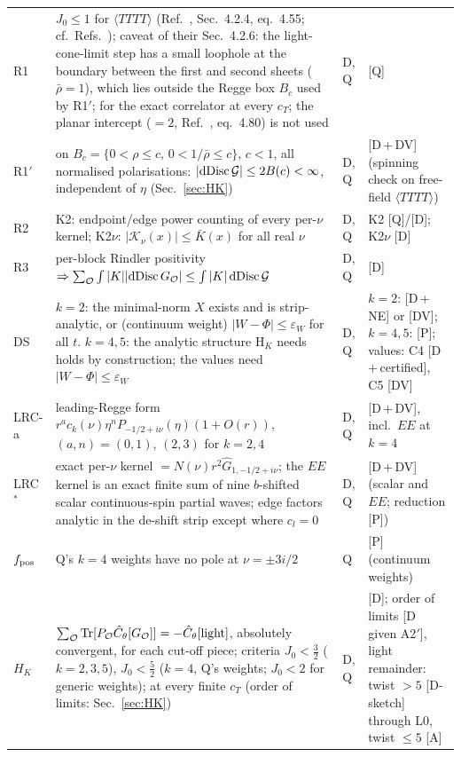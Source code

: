 \documentclass[aps,prl,onecolumn,superscriptaddress,nofootinbib]{revtex4-2}
\begin{document}
\begin{table}[!htbp]
\begin{ruledtabular}
\begin{tabular}{L{1.5cm}L{9.6cm}L{0.8cm}L{4.3cm}}
R1 & $J_0\le1$ for $\langle TTTT\rangle$ (Ref.~\cite{KKSDZ}, Sec.~4.2.4, eq.\ 4.55; cf.\ Refs.~\cite{CaronHuotInversion,HaringZhiboedov}); caveat of their Sec.~4.2.6: the light-cone-limit step has a small loophole at the boundary between the first and second sheets ($\bar\rho=1$), which lies outside the Regge box $B_c$ used by R1$'$; for the exact correlator at every $c_T$; the planar intercept ($=2$, Ref.~\cite{KKSDZ}, eq.~4.80) is not used & D, Q & [Q]\\
R1$'$ & on $B_c=\{0<\rho\le c,\,0<1/\bar\rho\le c\}$, $c<1$, all normalised polarisations: $|{\rm dDisc}\,\mathcal G|\le2B(c)<\infty$, independent of $\eta$ (Sec.~\ref{sec:HK}) & D, Q & [D\,+\,DV] (spinning check on free-field $\langle TTTT\rangle$)\\
R2 & K2: endpoint/edge power counting of every per-$\nu$ kernel; K2$\nu$: $|\mathcal K_\nu(x)|\le\bar K(x)$ for all real $\nu$ & D, Q & K2 [Q]/[D]; K2$\nu$ [D]\\
R3 & per-block Rindler positivity $\Rightarrow\sum_{\mathcal O}\int|K||{\rm dDisc}\,G_{\mathcal O}|\le\int|K|\,{\rm dDisc}\,\mathcal G$ & D, Q & [D]\\
DS & $k=2$: the minimal-norm $X$ exists and is strip-analytic, or (continuum weight) $|W-\Phi|\le\varepsilon_W$ for all $t$. $k=4,5$: the analytic structure H$_K$ needs holds by construction; the values need $|W-\Phi|\le\varepsilon_W$ & D, Q & $k=2$: [D\,+\,NE] or [DV]; $k=4,5$: [P]; values: C4 [D\,+\,certified], C5 [DV]\\
LRC-a & leading-Regge form $r^ac_k(\nu)\eta^nP_{-1/2+i\nu}(\eta)(1+O(r))$, $(a,n)=(0,1)$, $(2,3)$ for $k=2,4$ & D, Q & [D\,+\,DV], incl.\ $EE$ at $k=4$\\
LRC$^*$ & exact per-$\nu$ kernel $=N(\nu)r^2\hat G_{1,-1/2+i\nu}$; the $EE$ kernel is an exact finite sum of nine $b$-shifted scalar continuous-spin partial waves; edge factors analytic in the de-shift strip except where $c_l=0$ & D, Q & [D\,+\,DV] (scalar and $EE$; reduction [P])\\
$f_{\rm pos}$ & Q's $k=4$ weights have no pole at $\nu=\pm3i/2$ & Q & [P] (continuum weights)\\
$H_K$ & $\sum_{\mathcal O}{\rm Tr}[P_{\mathcal O}\hat C_\theta[G_{\mathcal O}]]=-\hat C_\theta[{\rm light}]$, absolutely convergent, for each cut-off piece; criteria $J_0<\tfrac32$ ($k=2,3,5$), $J_0<\tfrac52$ ($k=4$, Q's weights; $J_0<2$ for generic weights); at every finite $c_T$ (order of limits: Sec.~\ref{sec:HK}) & D, Q & [D]; order of limits [D given A2$'$], light remainder: twist $>5$ [D-sketch] through L0, twist $\le5$ [A]\\

\end{tabular}
\end{ruledtabular}
\end{table}
\end{document}

